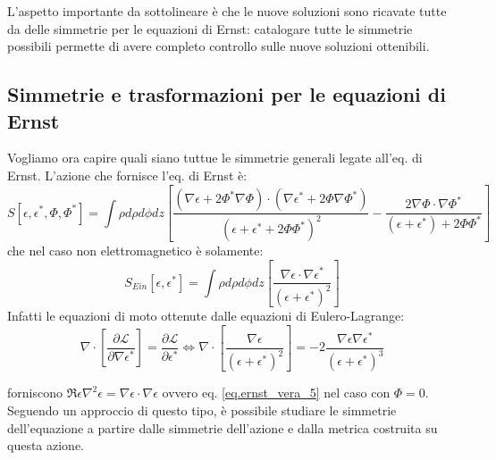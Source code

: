 L'aspetto importante da sottolineare è che le nuove soluzioni sono ricavate tutte da delle simmetrie per le equazioni di Ernst: catalogare tutte le simmetrie possibili permette di avere completo controllo sulle nuove soluzioni ottenibili.

\subsection{Simmetrie e trasformazioni per le equazioni di Ernst}
Vogliamo ora capire quali siano tuttue le simmetrie generali legate all'eq. di Ernst. L'azione che fornisce l'eq. di Ernst è:
\begin{equation}
    S[\epsilon, \epsilon^*, \Phi, \Phi^*] = \int \rho d\rho d\phi dz \left[ \frac{(\nabla\epsilon + 2\Phi^*\nabla\Phi)\cdot(\nabla\epsilon^* + 2\Phi\nabla\Phi^*)}{(\epsilon + \epsilon^* + 2\Phi\Phi^*)^2} - \frac{2\nabla\Phi\cdot\nabla\Phi^* }{(\epsilon + \epsilon^*) +2\Phi\Phi^*}\right]
    \label{eq.azione_ernst}
\end{equation}
che nel caso non elettromagnetico è solamente:
\begin{equation}
    S_{Ein}[\epsilon,\epsilon^*] = \int\rho d\rho d\phi dz \left[ \frac{\nabla\epsilon \cdot \nabla \epsilon^*}{(\epsilon + \epsilon^*)^2} \right]
    \label{eq.azione_ernst_non_em}
\end{equation}
Infatti le equazioni di moto ottenute dalle equazioni di Eulero-Lagrange:
\begin{equation*}
    \nabla\cdot\left[ \frac{\partial \mathcal{L}}{\partial \nabla\epsilon^*}\right] = \frac{\partial \mathcal L}{\partial \epsilon^*} \iff \nabla\cdot\left[ \frac{\nabla\epsilon}{(\epsilon + \epsilon^*)^2}\right] = -2 \frac{\nabla\epsilon\nabla\epsilon^*}{(\epsilon + \epsilon^*)^3}
\end{equation*}

forniscono $\Re \epsilon \nabla^2\epsilon = \nabla \epsilon \cdot \nabla \epsilon$ ovvero eq. \ref{eq.ernst_vera_5} nel caso con $\Phi=0$.
Seguendo un approccio di questo tipo, è possibile studiare le simmetrie dell'equazione a partire dalle simmetrie dell'azione e dalla metrica costruita su questa azione.


